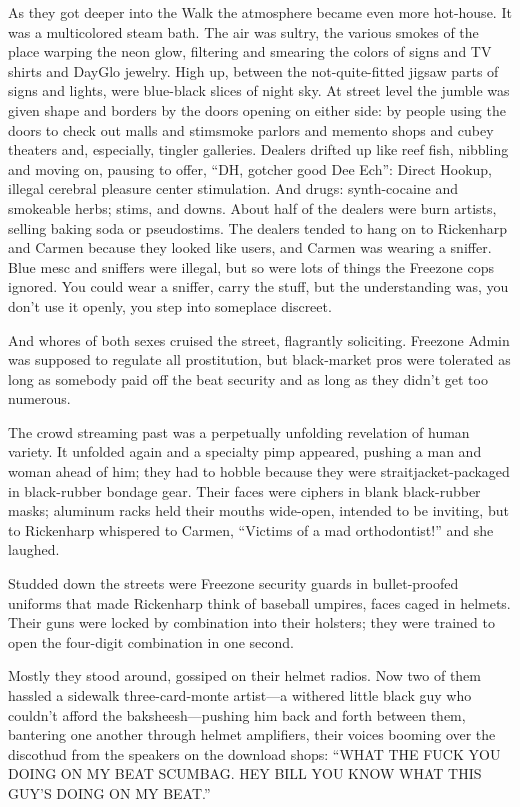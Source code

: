 As they got deeper into the Walk the atmosphere became even more hot-house. It was a multicolored steam bath. The air was sultry, the various smokes of the place warping the neon glow, filtering and smearing the colors of signs and TV shirts and DayGlo jewelry. High up, between the not-quite-fitted jigsaw parts of signs and lights, were blue-black slices of night sky. At street level the jumble was given shape and borders by the doors opening on either side: by people using the doors to check out malls and stimsmoke parlors and memento shops and cubey theaters and, especially, tingler galleries. Dealers drifted up like reef fish, nibbling and moving on, pausing to offer, ``DH, gotcher good Dee Ech'': Direct Hookup, illegal cerebral pleasure center stimulation. And drugs: synth-cocaine and smokeable herbs; stims, and downs. About half of the dealers were burn artists, selling baking soda or pseudostims. The dealers tended to hang on to Rickenharp and Carmen because they looked like users, and Carmen was wearing a sniffer. Blue mesc and sniffers were illegal, but so were lots of things the Freezone cops ignored. You could wear a sniffer, carry the stuff, but the understanding was, you don't use it openly, you step into someplace discreet.

And whores of both sexes cruised the street, flagrantly soliciting. Freezone Admin was supposed to regulate all prostitution, but black-market pros were tolerated as long as somebody paid off the beat security and as long as they didn't get too numerous.

The crowd streaming past was a perpetually unfolding revelation of human variety. It unfolded again and a specialty pimp appeared, pushing a man and woman ahead of him; they had to hobble because they were straitjacket-packaged in black-rubber bondage gear. Their faces were ciphers in blank black-rubber masks; aluminum racks held their mouths wide-open, intended to be inviting, but to Rickenharp whispered to Carmen, ``Victims of a mad orthodontist!'' and she laughed.

Studded down the streets were Freezone security guards in bullet-proofed uniforms that made Rickenharp think of baseball umpires, faces caged in helmets. Their guns were locked by combination into their holsters; they were trained to open the four-digit combination in one second.

Mostly they stood around, gossiped on their helmet radios. Now two of them hassled a sidewalk three-card-monte artist—a withered little black guy who couldn't afford the baksheesh—pushing him back and forth between them, bantering one another through helmet amplifiers, their voices booming over the discothud from the speakers on the download shops: ``WHAT THE FUCK YOU DOING ON MY BEAT SCUMBAG. HEY BILL YOU KNOW WHAT THIS GUY'S DOING ON MY BEAT.''

